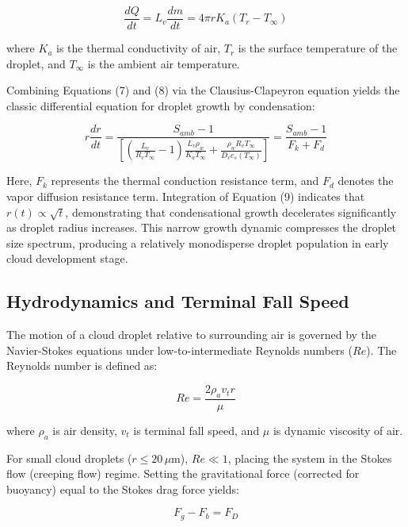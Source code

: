 \documentclass[12pt]{article}
\begin{document}
\begin{equation}
\frac{dQ}{dt} = L_v \frac{dm}{dt} = 4 \pi r K_a (T_r - T_{\infty})
\end{equation}

where $K_a$ is the thermal conductivity of air, $T_r$ is the surface temperature of the droplet, and $T_{\infty}$ is the ambient air temperature.

Combining Equations (7) and (8) via the Clausius-Clapeyron equation yields the classic differential equation for droplet growth by condensation:

\begin{equation}
r \frac{dr}{dt} = \frac{S_{amb} - 1}{\left[ \left(\frac{L_v}{R_v T_{\infty}} - 1\right) \frac{L_v \rho_w}{K_a T_{\infty}} + \frac{\rho_w R_v T_{\infty}}{D_v e_s(T_{\infty})} \right]} = \frac{S_{amb} - 1}{F_k + F_d}
\end{equation}

Here, $F_k$ represents the thermal conduction resistance term, and $F_d$ denotes the vapor diffusion resistance term. Integration of Equation (9) indicates that $r(t) \propto \sqrt{t}$, demonstrating that condensational growth decelerates significantly as droplet radius increases. This narrow growth dynamic compresses the droplet size spectrum, producing a relatively monodisperse droplet population in early cloud development stage.

\subsection{Hydrodynamics and Terminal Fall Speed}
The motion of a cloud droplet relative to surrounding air is governed by the Navier-Stokes equations under low-to-intermediate Reynolds numbers ($Re$). The Reynolds number is defined as:

\begin{equation}
Re = \frac{2 \rho_a v_t r}{\mu}
\end{equation}

where $\rho_a$ is air density, $v_t$ is terminal fall speed, and $\mu$ is dynamic viscosity of air.

For small cloud droplets ($r \le 20\,\mu\text{m}$), $Re \ll 1$, placing the system in the Stokes flow (creeping flow) regime. Setting the gravitational force (corrected for buoyancy) equal to the Stokes drag force yields:

\begin{equation}
F_g - F_b = F_D
\end{equation}
\end{document}
